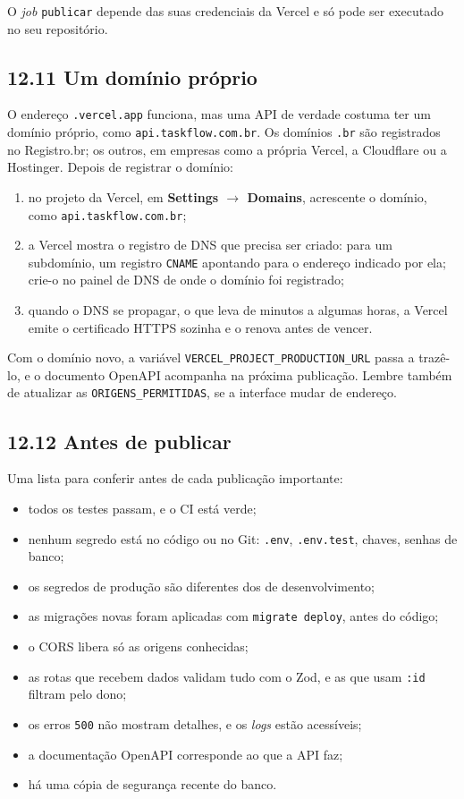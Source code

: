 O \textit{job} \texttt{publicar} depende das suas credenciais da Vercel e só pode ser executado no seu repositório.

\subsection{12.11 Um domínio próprio}

O endereço \texttt{.vercel.app} funciona, mas uma API de verdade costuma ter um domínio próprio, como \texttt{api.taskflow.com.br}. Os domínios \texttt{.br} são registrados no Registro.br; os outros, em empresas como a própria Vercel, a Cloudflare ou a Hostinger. Depois de registrar o domínio:

\begin{enumerate}
  \item no projeto da Vercel, em \textbf{Settings $\rightarrow$ Domains}, acrescente o domínio, como \texttt{api.taskflow.com.br};
  \item a Vercel mostra o registro de DNS que precisa ser criado: para um subdomínio, um registro \texttt{CNAME} apontando para o endereço indicado por ela; crie-o no painel de DNS de onde o domínio foi registrado;
  \item quando o DNS se propagar, o que leva de minutos a algumas horas, a Vercel emite o certificado HTTPS sozinha e o renova antes de vencer.
\end{enumerate}

Com o domínio novo, a variável \texttt{VERCEL\_PROJECT\_PRODUCTION\_URL} passa a trazê-lo, e o documento OpenAPI acompanha na próxima publicação. Lembre também de atualizar as \texttt{ORIGENS\_PERMITIDAS}, se a interface mudar de endereço.

\subsection{12.12 Antes de publicar}

Uma lista para conferir antes de cada publicação importante:

\begin{itemize}
  \item todos os testes passam, e o CI está verde;
  \item nenhum segredo está no código ou no Git: \texttt{.env}, \texttt{.env.test}, chaves, senhas de banco;
  \item os segredos de produção são diferentes dos de desenvolvimento;
  \item as migrações novas foram aplicadas com \texttt{migrate deploy}, antes do código;
  \item o CORS libera só as origens conhecidas;
  \item as rotas que recebem dados validam tudo com o Zod, e as que usam \texttt{:id} filtram pelo dono;
  \item os erros \texttt{500} não mostram detalhes, e os \textit{logs} estão acessíveis;
  \item a documentação OpenAPI corresponde ao que a API faz;
  \item há uma cópia de segurança recente do banco.
\end{itemize}

